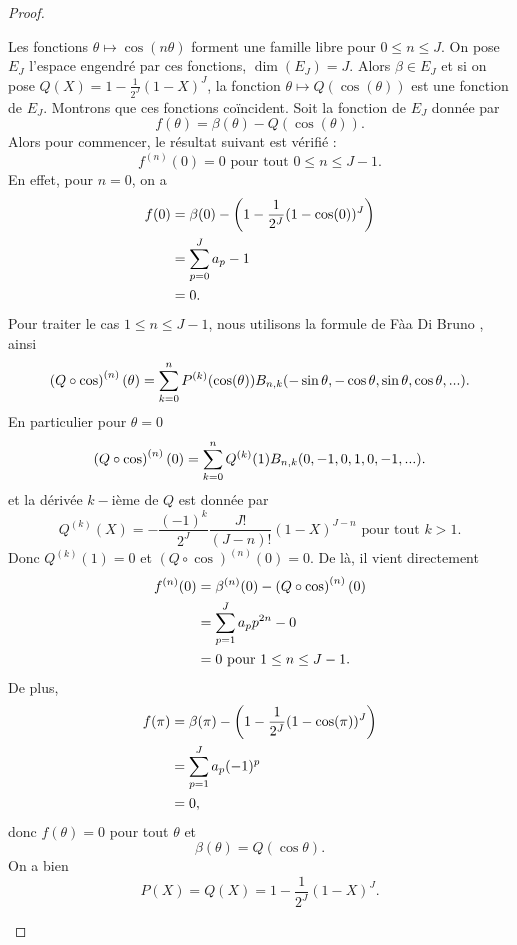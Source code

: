 \begin{proof}
\begin{itemize}
Les fonctions $\theta \mapsto \cos (n \theta)$ forment une famille libre pour $0 \leq n \leq J$. On pose $E_J$ l'espace engendré par ces fonctions, $\dim (E_J) = J$. Alors $\beta \in E_J$ et si on pose $Q(X)= 1 - \frac{1}{2^J}(1-X)^J$, la fonction $\theta \mapsto Q(\cos(\theta))$ est une fonction de $E_J$. Montrons que ces fonctions coïncident.
Soit la fonction de $E_J$ donnée par
\begin{equation}
f(\theta) = \beta(\theta) - Q(\cos (\theta)).
\end{equation}
Alors pour commencer, le résultat suivant est vérifié :
\begin{equation}
f^{(n)}(0) = 0 \text{ pour tout } 0 \leq n \leq J-1.
\end{equation}
En effet, pour $n=0$, on a
\begin{align*}
f(0) & = \beta(0) - \left( 1-\dfrac{1}{2^J}(1 - \cos (0))^J \right) \\
	& = \displaystyle\sum\limits_{p=0}^J a_p - 1 \\
	& = 0.
\end{align*}
Pour traiter le cas $1 \leq n \leq J-1$, nous utilisons la formule de Fàa Di Bruno \cite{Comtet2012}, ainsi
\begin{equation}
\left( Q \circ \cos \right)^{(n)}(\theta) = \displaystyle\sum\limits_{k=0}^n P^{(k)}(\cos(\theta)) B_{n,k}(-\sin \theta, - \cos \theta, \sin \theta, \cos \theta, ...).
\end{equation}
En particulier pour $\theta = 0$
\begin{equation}
\left( Q \circ \cos \right)^{(n)}(0) = \displaystyle\sum\limits_{k=0}^n Q^{(k)}(1) B_{n,k}(0, -1, 0, 1, 0, -1, ...).
\end{equation}
et la dérivée $k-$ième de $Q$ est donnée par
\begin{equation}
Q^{(k)}(X) = - \dfrac{(-1)^k}{2^J} \dfrac{J!}{(J-n)!}(1-X)^{J-n} \text{ pour tout } k>1.
\end{equation}
Donc $Q^{(k)}(1)=0$ et $\left( Q \circ \cos \right)^{(n)}(0) =0$. De là, il vient directement
\begin{align*}
f^{(n)}(0) & = \beta^{(n)}(0) - \left( Q \circ \cos \right)^{(n)}(0) \\
	& = \displaystyle\sum\limits_{p=1}^J a_p p^{2n} - 0 \\
	& = 0 \text{ pour } 1 \leq n \leq J-1.
\end{align*}
De plus,
\begin{align*}
f(\pi) & = \beta(\pi) - \left( 1-\dfrac{1}{2^J}(1 - \cos (\pi))^J \right) \\
	& = \displaystyle\sum\limits_{p=1}^J a_p(-1)^p \\
	& = 0,
\end{align*}
donc $f(\theta) = 0$ pour tout $\theta$ et
\begin{equation}
\beta(\theta) = Q(\cos\theta).
\end{equation}
On a bien
\begin{equation}
P(X) = Q(X) = 1-\dfrac{1}{2^J}(1-X)^J.
\end{equation}


\end{itemize}
\end{proof}
